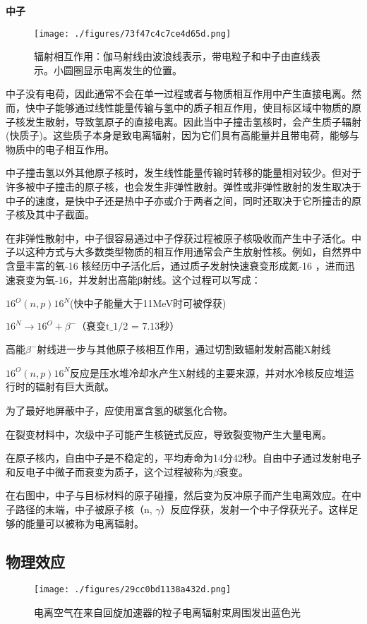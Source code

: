 \textbf{中子}

\begin{figure}[ht]
\centering
\texttt{[image: ./figures/73f47c4c7ce4d65d.png]}
\caption{辐射相互作用：伽马射线由波浪线表示，带电粒子和中子由直线表示。小圆圈显示电离发生的位置。} \label{fig_DLFS_5}
\end{figure}
中子没有电荷，因此通常不会在单一过程或者与物质相互作用中产生直接电离。然而，快中子能够通过线性能量传输与氢中的质子相互作用，使目标区域中物质的原子核发生散射，导致氢原子的直接电离。因此当中子撞击氢核时，会产生质子辐射(快质子)。这些质子本身是致电离辐射，因为它们具有高能量并且带电荷，能够与物质中的电子相互作用。

中子撞击氢以外其他原子核时，发生线性能量传输时转移的能量相对较少。但对于许多被中子撞击的原子核，也会发生非弹性散射。弹性或非弹性散射的发生取决于中子的速度，是快中子还是热中子亦或介于两者之间，同时还取决于它所撞击的原子核及其中子截面。

在非弹性散射中，中子很容易通过中子俘获过程被原子核吸收而产生中子活化。中子以这种方式与大多数类型物质的相互作用通常会产生放射性核。例如，自然界中含量丰富的氧-16 核经历中子活化后，通过质子发射快速衰变形成氮-16 ，进而迅速衰变为氧-16，并发射出高能β射线。这个过程可以写成：

$16^O (n,p)16^N$(快中子能量大于11MeV时可被俘获)

$16^N \to 16^O + \beta^-\text{（衰变t_{1/2} = 7.13秒）}$

高能$\beta^-$射线进一步与其他原子核相互作用，通过切割致辐射发射高能X射线

$16^O (n,p)16^N$反应是压水堆冷却水产生X射线的主要来源，并对水冷核反应堆运行时的辐射有巨大贡献。

为了最好地屏蔽中子，应使用富含氢的碳氢化合物。

在裂变材料中，次级中子可能产生核链式反应，导致裂变物产生大量电离。

在原子核内，自由中子是不稳定的，平均寿命为14分42秒。自由中子通过发射电子和反电子中微子而衰变为质子，这个过程被称为$\beta$衰变。

在右图中，中子与目标材料的原子碰撞，然后变为反冲原子而产生电离效应。在中子路径的末端，中子被原子核（n, $\gamma$）反应俘获，发射一个中子俘获光子。这样足够的能量可以被称为电离辐射。

\subsection{物理效应}
\begin{figure}[ht]
\centering
\texttt{[image: ./figures/29cc0bd1138a432d.png]}
\caption{电离空气在来自回旋加速器的粒子电离辐射束周围发出蓝色光} \label{fig_DLFS_6}
\end{figure}

